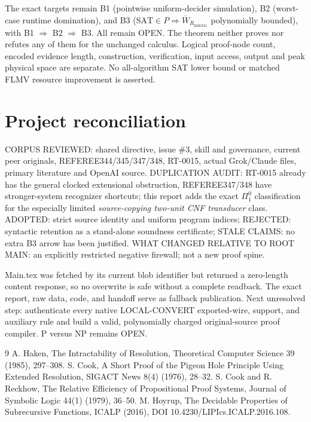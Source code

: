 \documentclass[11pt]{article}
\begin{document}
The exact targets remain B1 (pointwise uniform-decider simulation), B2 (worst-case runtime domination), and B3 ($\mathrm{SAT}\in P\Rightarrow\overline W_{R_{\mathrm{mix341}}}$ polynomially bounded), with B1 $\Rightarrow$ B2 $\Rightarrow$ B3. All remain OPEN. The theorem neither proves nor refutes any of them for the unchanged calculus. Logical proof-node count, encoded evidence length, construction, verification, input access, output and peak physical space are separate. No all-algorithm SAT lower bound or matched FLMV resource improvement is asserted.

\section*{Project reconciliation}
CORPUS REVIEWED: shared directive, issue \#3, skill and governance, current peer originals, REFEREE344/345/347/348, RT-0015, actual Grok/Claude files, primary literature and OpenAI source. DUPLICATION AUDIT: RT-0015 already has the general clocked extensional obstruction, REFEREE347/348 have stronger-system recognizer shortcuts; this report adds the exact $\Pi^0_1$ classification for the especially limited \emph{source-copying two-unit CNF transducer} class. ADOPTED: strict source identity and uniform program indices; REJECTED: syntactic retention as a stand-alone soundness certificate; STALE CLAIMS: no extra B3 arrow has been justified. WHAT CHANGED RELATIVE TO ROOT MAIN: an explicitly restricted negative firewall; not a new proof spine.

Main.tex was fetched by its current blob identifier but returned a zero-length content response, so no overwrite is safe without a complete readback. The exact report, raw data, code, and handoff serve as fallback publication. Next unresolved step: authenticate every native LOCAL-CONVERT exported-wire, support, and auxiliary rule and build a valid, polynomially charged original-source proof compiler. P versus NP remains OPEN.

\begin{thebibliography}{9}
 A. Haken, The Intractability of Resolution, Theoretical Computer Science 39 (1985), 297--308.
 S. Cook, A Short Proof of the Pigeon Hole Principle Using Extended Resolution, SIGACT News 8(4) (1976), 28--32.
 S. Cook and R. Reckhow, The Relative Efficiency of Propositional Proof Systems, Journal of Symbolic Logic 44(1) (1979), 36--50.
 M. Hoyrup, The Decidable Properties of Subrecursive Functions, ICALP (2016), DOI 10.4230/LIPIcs.ICALP.2016.108.
\end{thebibliography}
\end{document}
